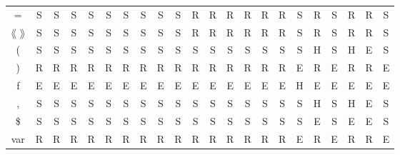 \begin{table}[H]
{\begin{tabular}{c|ccccccccccccccccccccc}
=               & S  &  S  & S & S &  S  & S & S & S  &  S  &   R     &    R    & R  & R  & R & R  & S & R & S & R & R  & S   \\ %
$\lang$ $\rang$ & S  &  S  & S & S &  S  & S & S & S  &  S  &   R     &    R    & R  & R  & R & R  & S & R & S & R & R  & S   \\ %
(               & S  &  S  & S & S &  S  & S & S & S  &  S  &   S     &    S    & S  & S  & S & S  & S & H & S & H & E  & S   \\ %
)               & R  &  R  & R & R &  R  & R & R & R  &  R  &   R     &    R    & R  & R  & R & R  & E & R & E & R & R  & E   \\ %
f               & E  &  E  & E & E &  E  & E & E & E  &  E  &   E     &    E    & E  & E  & E & E  & H & E & E & E & E  & E   \\ %
,               & S  &  S  & S & S &  S  & S & S & S  &  S  &   S     &    S    & S  & S  & S & S  & S & H & S & H & E  & S   \\ %
\$              & S  &  S  & S & S &  S  & S & S & S  &  S  &   S     &    S    & S  & S  & S & S  & S & E & S & E & E  & S   \\ %
var             & R  &  R  & R & R &  R  & R & R & R  &  R  &   R     &    R    & R  & R  & R & R  & E & R & E & R & R  & E      %
\end{tabular}
} %
\end{table}

